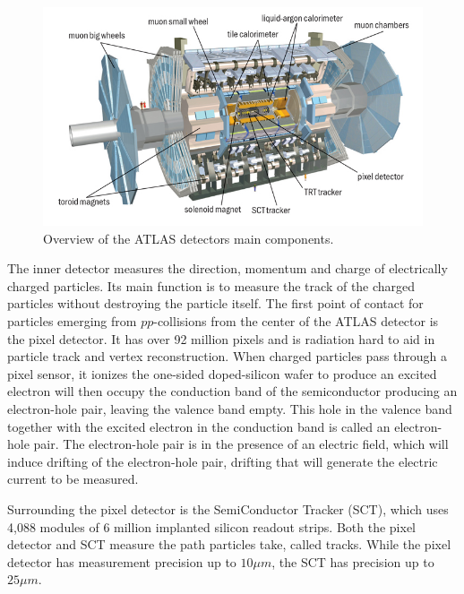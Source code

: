 \begin{figure}[h]
    \centering
    \includegraphics[width=.8\textwidth]{content/img/ATLAS_Detector.jpg}
    \caption{Overview of the ATLAS detectors main components. \cite{ATLAS_Illustration}}
    \label{fig:intro_ATLAS_detector}
\end{figure}


The inner detector measures the direction, momentum and charge of electrically charged particles.
Its main function is to measure the track of the charged particles without destroying the particle itself.
The first point of contact for particles emerging from $pp$-collisions from the center of the ATLAS detector is the pixel detector.\cite{PixelDetector_2008}
It has over 92 million pixels and is radiation hard to aid in particle track and vertex reconstruction.
When charged particles pass through a pixel sensor, it ionizes the one-sided doped-silicon wafer to produce an excited electron will then occupy the conduction band of the semiconductor producing an electron-hole pair, leaving the valence band empty.\cite{KnollRadDetection}
This hole in the valence band together with the excited electron in the conduction band is called an electron-hole pair.
The electron-hole pair is in the presence of an electric field, which will induce drifting of the electron-hole pair, drifting that will generate the electric current to be measured.

Surrounding the pixel detector is the SemiConductor Tracker (SCT), which uses 4,088 modules of 6 million implanted silicon readout strips.\cite{ABDESSELAM2006642}
Both the pixel detector and SCT measure the path particles take, called tracks.
While the pixel detector has measurement precision up to $10 \mu m$, the SCT has precision up to $25\mu m$. 


